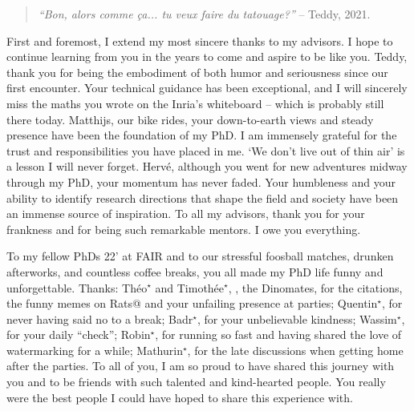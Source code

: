 \begin{quote}
    \centering
    \textit{``Bon, alors comme ça... tu veux faire du tatouage?''}
    --  Teddy, 2021. 
\end{quote}

First and foremost, I extend my most sincere thanks to my advisors. 
I hope to continue learning from you in the years to come and aspire to be like you.
Teddy, thank you for being the embodiment of both humor and seriousness since our first encounter. 
Your technical guidance has been exceptional, and I will sincerely miss the maths you wrote on the Inria's whiteboard -- which is probably still there today.
Matthijs, our bike rides, your down-to-earth views and steady presence have been the foundation of my PhD.
I am immensely grateful for the trust and responsibilities you have placed in me.
`We don't live out of thin air' is a lesson I will never forget.
Hervé, although you went for new adventures midway through my PhD, your momentum has never faded. 
Your humbleness and your ability to identify research directions that shape the field and society have been an immense source of inspiration. 
To all my advisors, thank you for your frankness and for being such remarkable mentors. 
I owe you everything.

To my fellow PhDs 22' at FAIR and to our stressful foosball matches, drunken afterworks, and countless coffee breaks, you all made my PhD life funny and unforgettable.
Thanks:
Théo$^\star$ and Timothée$^\star$, \aka, the Dinomates, for the citations, the funny memes on Rats@ and your unfailing presence at parties;
Quentin$^\star$, for never having said no to a break;
Badr$^\star$, for your unbelievable kindness;
Wassim$^\star$, for your daily ``check'';
Robin$^\star$, for running so fast and having shared the love of watermarking for a while;
Mathurin$^\star$, for the late discussions when getting home after the parties.
To all of you, I  am so proud to have shared this journey with you and to be friends with such talented and kind-hearted people.
You really were the best people I could have hoped to share this experience with.

